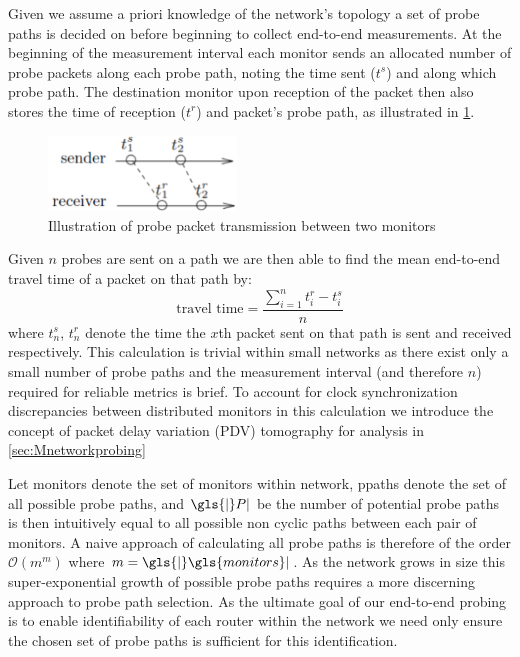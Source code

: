     Given we assume a priori knowledge of the network's topology a set of probe paths is decided on before beginning to collect end-to-end measurements. At the beginning of the measurement interval each monitor sends an allocated number of probe packets along each probe path, noting the time sent ($t^s$) and along which probe path. The destination monitor upon reception of the packet then also stores the time of reception ($t^r$) and packet's probe path, as illustrated in \ref{fig:pptransmission}. 
    \begin{figure}[H]
        \centering
        \includegraphics[width=5cm]{figs/background/probe_transmission.png}
        \caption[Illustration of probe packet transmission between two monitors]{Illustration of probe packet transmission between two monitors \protect\cite{he_fisher_2015}}
        \label{fig:pptransmission}
    \end{figure}\newpage
    \noindent Given $n$ probes are sent on a path we are then able to find the mean end-to-end travel time of a packet on that path by: \[\text{travel time}=\frac{\sum_{i=1}^nt_i^r - t_i^s}{n}\] where $t_n^s$, $t_n^r$ denote the time the $x$th packet sent on that path is sent and received respectively. This calculation is trivial within small networks as there exist only a small number of probe paths and the measurement interval (and therefore $n$) required for reliable metrics is brief. To account for clock synchronization discrepancies between distributed monitors in this calculation we introduce the concept of packet delay variation (PDV) tomography for analysis in \cref{sec:Mnetworkprobing} \par

    Let \gls{monitors} denote the set of monitors within \gls{network}, \gls{ppaths} denote the set of all possible probe paths, and $\gls{|}P|$ be the number of potential probe paths  is then intuitively equal to all possible non cyclic paths between each pair of monitors. A naive approach of calculating all probe paths is therefore of the order $\mathcal{O}(m^m)$ where $m=\gls{|}\gls{monitors}|$. As the network grows in size this super-exponential growth of possible probe paths requires a more discerning approach to probe path selection. As the ultimate goal of our end-to-end probing is to enable identifiability of each router within the network we need only ensure the chosen set of probe paths is sufficient for this identification.\par
    
